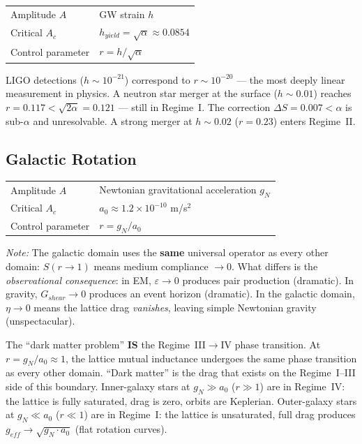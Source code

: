 \begin{center}
\begin{tabular}{ll}
\toprule
Amplitude $A$ & GW strain $h$ \\
Critical $A_c$ & $h_{yield} = \sqrt{\alpha} \approx 0.0854$ \\
Control parameter & $r = h / \sqrt{\alpha}$ \\
\bottomrule
\end{tabular}
\end{center}

\noindent LIGO detections ($h \sim 10^{-21}$) correspond to $r \sim 10^{-20}$ --- the most deeply linear measurement in physics. A neutron star merger at the surface ($h \sim 0.01$) reaches $r = 0.117 < \sqrt{2\alpha} = 0.121$ --- still in Regime~I. The correction $\Delta S = 0.007 < \alpha$ is sub-$\alpha$ and unresolvable. A strong merger at $h \sim 0.02$ ($r = 0.23$) enters Regime~II.

\subsection{Galactic Rotation}

\begin{center}
\begin{tabular}{ll}
\toprule
Amplitude $A$ & Newtonian gravitational acceleration $g_N$ \\
Critical $A_c$ & $a_0 \approx 1.2 \times 10^{-10}$ m/s$^2$ \\
Control parameter & $r = g_N / a_0$ \\
\bottomrule
\end{tabular}
\end{center}

\noindent \textit{Note:} The galactic domain uses the \textbf{same} universal operator as every other domain: $S(r \to 1)$ means medium compliance $\to 0$. What differs is the \textit{observational consequence}: in EM, $\varepsilon \to 0$ produces pair production (dramatic). In gravity, $G_{shear} \to 0$ produces an event horizon (dramatic). In the galactic domain, $\eta \to 0$ means the lattice drag \textit{vanishes}, leaving simple Newtonian gravity (unspectacular).

The ``dark matter problem'' \textbf{IS} the Regime~III$\to$IV phase transition. At $r = g_N/a_0 \approx 1$, the lattice mutual inductance undergoes the same phase transition as every other domain. ``Dark matter'' is the drag that exists on the Regime~I--III side of this boundary. Inner-galaxy stars at $g_N \gg a_0$ ($r \gg 1$) are in Regime~IV: the lattice is fully saturated, drag is zero, orbits are Keplerian. Outer-galaxy stars at $g_N \ll a_0$ ($r \ll 1$) are in Regime~I: the lattice is unsaturated, full drag produces $g_{eff} \to \sqrt{g_N \cdot a_0}$ (flat rotation curves).

